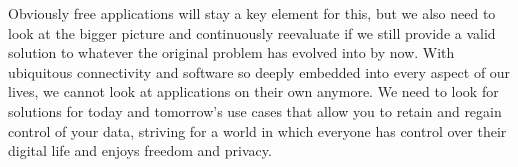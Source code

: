 Obviously free applications will stay a key element for this, but we also need to look at the bigger picture and continuously reevaluate if we still provide a valid solution to whatever the original problem has evolved into by now. With ubiquitous connectivity and software so deeply embedded into every aspect of our lives, we cannot look at applications on their own anymore. We need to look for solutions for today and tomorrow's use cases that allow you to retain and regain control of your data, striving for a world in which everyone has control over their digital life and enjoys freedom and privacy.
